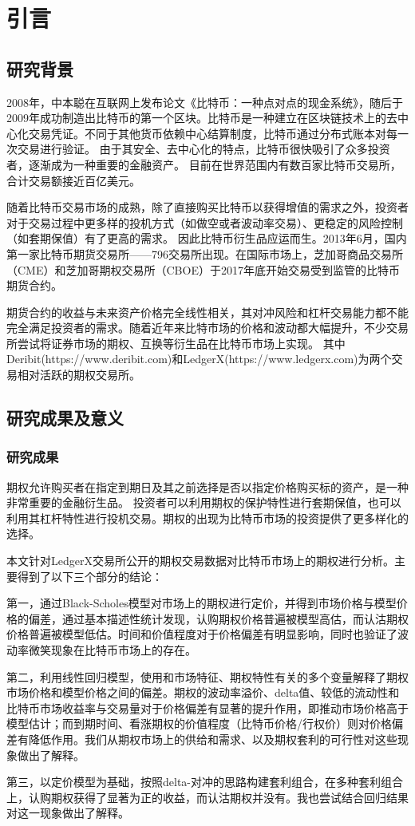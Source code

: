 \chapter{引言}
\section{研究背景}
\par{2008年，中本聪在互联网上发布论文《比特币：一种点对点的现金系统》\cite{Nakamoto_bitcoin:a}，随后于2009年成功制造出比特币的第一个区块。比特币是一种建立在区块链技术上的去中心化交易凭证。不同于其他货币依赖中心结算制度，比特币通过分布式账本对每一次交易进行验证。
由于其安全、去中心化的特点，比特币很快吸引了众多投资者，逐渐成为一种重要的金融资产。
目前在世界范围内有数百家比特币交易所，合计交易额接近百亿美元。
}
\par{随着比特币交易市场的成熟，除了直接购买比特币以获得增值的需求之外，投资者对于交易过程中更多样的投机方式（如做空或者波动率交易）、更稳定的风险控制（如套期保值）有了更高的需求。
因此比特币衍生品应运而生。2013年6月，国内第一家比特币期货交易所——796交易所出现。在国际市场上，芝加哥商品交易所（CME）和芝加哥期权交易所（CBOE）于2017年底开始交易受到监管的比特币期货合约。
}
\par{期货合约的收益与未来资产价格完全线性相关，其对冲风险和杠杆交易能力都不能完全满足投资者的需求。随着近年来比特市场的价格和波动都大幅提升，不少交易所尝试将证券市场的期权、互换等衍生品在比特币市场上实现。
其中Deribit(https://www.deribit.com)和LedgerX(https://www.ledgerx.com)为两个交易相对活跃的期权交易所。}
\section{研究成果及意义}
\subsection{研究成果}
期权允许购买者在指定到期日及其之前选择是否以指定价格购买标的资产，是一种非常重要的金融衍生品。
投资者可以利用期权的保护特性进行套期保值，也可以利用其杠杆特性进行投机交易。期权的出现为比特币市场的投资提供了更多样化的选择。
\par{本文针对LedgerX交易所公开的期权交易数据对比特币市场上的期权进行分析。主要得到了以下三个部分的结论：}
\par{第一，通过Black-Scholes模型对市场上的期权进行定价，并得到市场价格与模型价格的偏差，通过基本描述性统计发现，认购期权价格普遍被模型高估，而认沽期权价格普遍被模型低估。时间和价值程度对于价格偏差有明显影响，同时也验证了波动率微笑现象在比特币市场上的存在。}
\par{第二，利用线性回归模型，使用和市场特征、期权特性有关的多个变量解释了期权市场价格和模型价格之间的偏差。期权的波动率溢价、delta值、较低的流动性和比特币市场收益率与交易量对于价格偏差有显著的提升作用，即推动市场价格高于模型估计；而到期时间、看涨期权的价值程度（比特币价格/行权价）则对价格偏差有降低作用。我们从期权市场上的供给和需求、以及期权套利的可行性对这些现象做出了解释。}
\par{第三，以定价模型为基础，按照delta-对冲的思路构建套利组合，在多种套利组合上，认购期权获得了显著为正的收益，而认沽期权并没有。我也尝试结合回归结果对这一现象做出了解释。}
